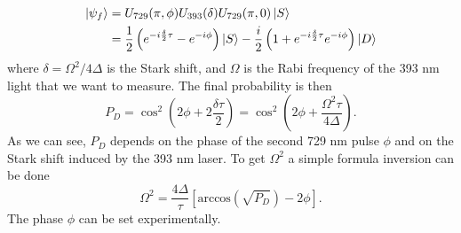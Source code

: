 \begin{equation}
\begin{split}
\ket{\psi_f} &= U_{729}(\pi,\phi)U_{393}(\delta)U_{729}(\pi,0)\ket{S} \\
&= \frac{1}{2}\left(e^{-i\frac{\delta}{2}\tau}-e^{-i\phi}\right)\ket{S}-\frac{i}{2}\left(1 + e^{-i\frac{\delta}{2}\tau} e^{-i\phi}\right)\ket{D}
\end{split}
\end{equation}
where $\delta = \Omega^2/4\Delta$ is the Stark shift, and $\Omega$ is the Rabi frequency of the 393 nm light that we want to measure. The final probability is then
\begin{equation}
\label{stupidequation}
P_D = \cos^2\left(2\phi + 2\frac{\delta \tau}{2}\right) = \cos^2\left(2\phi + \frac{\Omega^2 \tau}{4\Delta}\right).
\end{equation}
As we can see, $P_D$ depends on the phase of the second 729 nm pulse $\phi$ and on the Stark shift induced by the 393 nm laser. To get $\Omega^2$ a simple formula inversion can be done
\begin{equation}
\label{eq:ptointensity}
\Omega^2 = \frac{4\Delta}{\tau}\left[\text{arccos}\left(\sqrt{P_D}\right)-2\phi \right].
\end{equation}
The phase $\phi$ can be set experimentally.

